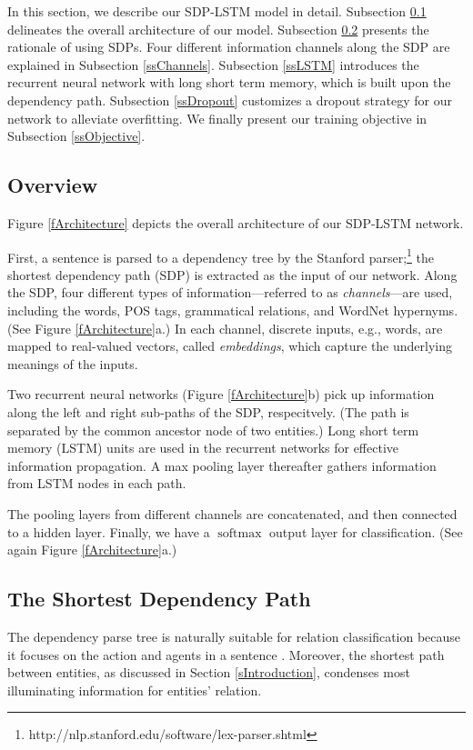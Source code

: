 \documentclass[11pt,a4paper]{article}
\begin{document}
In this section, we describe our SDP-LSTM model in detail.
Subsection \ref{ssOverview} delineates the overall architecture
of our model.
Subsection \ref{ssSDP} presents the rationale of using SDPs.
Four different information channels along
the SDP are explained in Subsection \ref{ssChannels}.
Subsection \ref{ssLSTM} introduces the
recurrent neural network with long short term memory, which
is built upon the dependency path. Subsection \ref{ssDropout} customizes
a dropout strategy for our network to alleviate overfitting.
We finally present our training objective in Subsection \ref{ssObjective}.

\subsection{Overview}\label{ssOverview}

Figure \ref{fArchitecture}
depicts the overall architecture of our SDP-LSTM network.

First, a sentence is parsed to a dependency tree by the Stanford parser;\footnote{
http://nlp.stanford.edu/software/lex-parser.shtml} the shortest dependency path (SDP) is extracted as the input of our network.
Along the SDP, four different types of
information---referred to as \textit{channels}---are used, including the words, POS tags,
grammatical relations, and WordNet hypernyms.
(See Figure \ref{fArchitecture}a.)
In each channel, discrete inputs, e.g., words,
are mapped to real-valued vectors, called
\textit{embeddings}, which capture the underlying
meanings of the inputs.

Two recurrent neural networks (Figure \ref{fArchitecture}b)
pick up information along the left and right
sub-paths of the SDP, respecitvely. (The path is separated by the common ancestor node of two entities.)
Long short term memory (LSTM) units
are used in the recurrent networks
for effective information propagation.
A max pooling layer thereafter gathers information
from LSTM nodes in each path.

The pooling layers from different channels are concatenated,
and then connected to a hidden layer.
Finally, we have a $\operatorname{softmax}$ output layer for classification.
(See again Figure \ref{fArchitecture}a.)

\subsection{The Shortest Dependency Path}\label{ssSDP}

The dependency parse tree is naturally
suitable for relation classification because
it focuses on the action and agents in a sentence \cite{ImageSent}.
Moreover, the shortest path between entities, as discussed in Section \ref{sIntroduction},  condenses most illuminating information for entities' relation.
\end{document}

